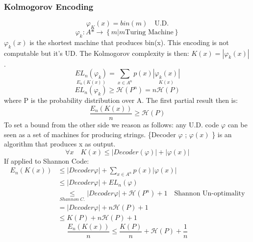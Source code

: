     \subsubsection*{Kolmogorov Encoding}
    $$\varphi_K(x) = bin(m)\quad\text{U.D.}$$
    $$\varphi_k: A* \longrightarrow \left\{ m | m \text{Turing Machine} \right\}$$
    $\varphi_k(x)$ is the shortest machine that produces bin(x). This encoding is not computable but it's UD.
    The Kolmogorov complexity is then: $K(x) = |\varphi_k(x)|$.
    $$\underset{E_n(K(x))}{EL_n(\varphi_k)} = \sum_{x\in A^n}{p(x)\underset{K(x)}{|\varphi_k(x)|}}$$
    $$EL_n(\varphi_k) \geq \mathcal{H}(P^n) = n\mathcal{H}(P)$$
    where P is the probability distribution over A. The first partial result then is: 
    $$\frac{E_n(K(x))}{n} \geq \mathcal{H}(P)$$
    To set a bound from the other side we reason as follows: any U.D. code $\varphi$ can be seen as a set of machines for producing strings. \{Decoder $\varphi$ ; $\varphi(x)$ \} is an algorithm that produces x as output.
    $$\forall x\quad K(x) \leq |Decoder(\varphi)|+|\varphi(x)|$$
    If applied to Shannon Code:
    \begin{align*}
        E_n(K(x)) &\leq |Decoder \varphi|+ \sum_{x\in A^n}{p(x)|\varphi(x)|}\\
        & \leq |Decoder \varphi| + EL_n(\varphi)\\
        & \underset{Shannon\;C.}{\leq} |Decoder \varphi| + \mathcal{H}(P^n)+1 \quad \text{Shannon Un-optimality}\\
        & =|Decoder \varphi| + n\mathcal{H}(P)+1\\
        & \leq K(P) + n\mathcal{H}(P)+1
    \end{align*}
    $$\frac{E_n(K(x))}{n} \leq \frac{K(P)}{n}+ \mathcal{H}(P)+\frac{1}{n}$$
    
    

